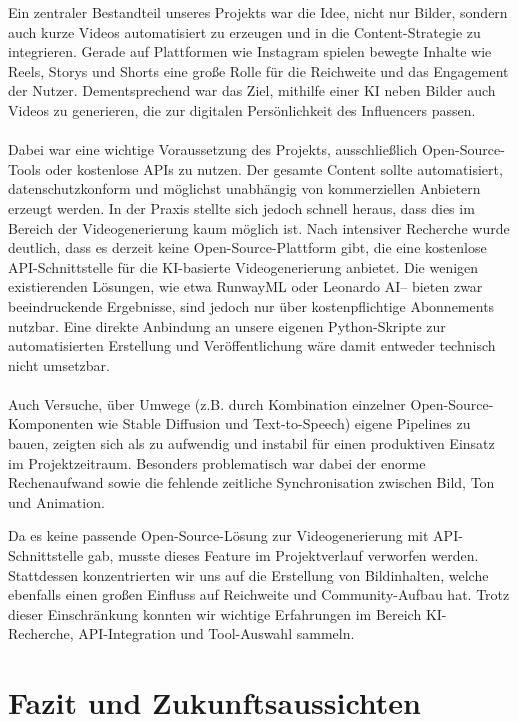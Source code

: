 \documentclass[a4paper,12pt]{article}
\begin{document}
Ein zentraler Bestandteil unseres Projekts war die Idee, nicht nur Bilder, sondern auch kurze Videos automatisiert zu erzeugen und in die Content-Strategie zu integrieren. Gerade auf Plattformen wie Instagram spielen bewegte Inhalte wie Reels, Storys und Shorts eine große Rolle für die Reichweite und das Engagement der Nutzer. Dementsprechend war das Ziel, mithilfe einer KI neben Bilder auch Videos zu generieren, die zur digitalen Persönlichkeit des Influencers passen. \\\\
Dabei war eine wichtige Voraussetzung des Projekts, ausschließlich Open-Source-Tools oder kostenlose APIs zu nutzen. Der gesamte Content sollte automatisiert, datenschutzkonform und möglichst unabhängig von kommerziellen Anbietern erzeugt werden. In der Praxis stellte sich jedoch schnell heraus, dass dies im Bereich der Videogenerierung kaum möglich ist.
Nach intensiver Recherche wurde deutlich, dass es derzeit keine Open-Source-Plattform gibt, die eine kostenlose API-Schnittstelle für die KI-basierte Videogenerierung anbietet. Die wenigen existierenden Lösungen, wie etwa RunwayML oder Leonardo AI– bieten zwar beeindruckende Ergebnisse, sind jedoch nur über kostenpflichtige Abonnements nutzbar. Eine direkte Anbindung an unsere eigenen Python-Skripte zur automatisierten Erstellung und Veröffentlichung wäre damit entweder technisch nicht umsetzbar. \\\\
Auch Versuche, über Umwege (z.B. durch Kombination einzelner Open-Source-Komponenten wie Stable Diffusion und Text-to-Speech) eigene Pipelines zu bauen, zeigten sich als zu aufwendig und instabil für einen produktiven Einsatz im Projektzeitraum. Besonders problematisch war dabei der enorme Rechenaufwand sowie die fehlende zeitliche Synchronisation zwischen Bild, Ton und Animation.

Da es keine passende Open-Source-Lösung zur Videogenerierung mit API-Schnittstelle gab, musste dieses Feature im Projektverlauf verworfen werden. Stattdessen konzentrierten wir uns auf die Erstellung von Bildinhalten, welche ebenfalls einen großen Einfluss auf Reichweite und Community-Aufbau hat. Trotz dieser Einschränkung konnten wir wichtige Erfahrungen im Bereich KI-Recherche, API-Integration und Tool-Auswahl sammeln.


\section{Fazit und Zukunftsaussichten}
\end{document}
